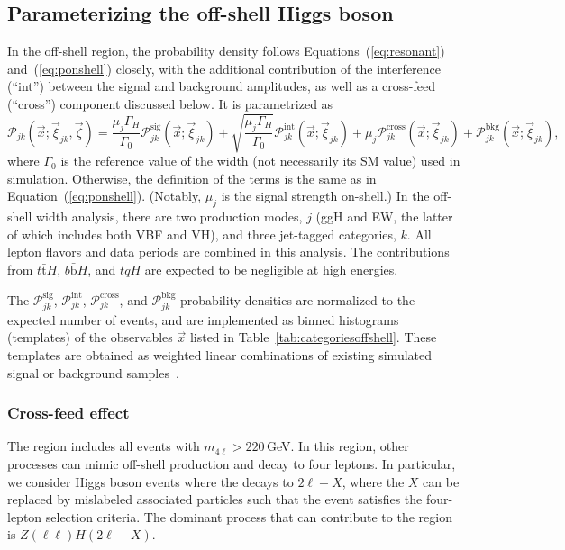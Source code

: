 \subsection{Parameterizing the off-shell Higgs boson} \label{physicsmodel}

In the off-shell region, the probability density follows Equations~(\ref{eq:resonant}) and~(\ref{eq:ponshell}) closely,
with the additional contribution of the interference (``int'') between the signal and background amplitudes,
as well as a cross-feed (``cross'') component discussed below. It is parametrized as 
\begin{equation}\label{eq:poffshell}
    \mathcal{P}_{jk}(\vec{x};\vec{\xi}_{jk},\vec\zeta) =
    \frac{\mu_j \Gamma_H}{\Gamma_0}\mathcal{P}_{jk}^\text{sig} ( \vec{x};\vec{\xi}_{jk})
    + \sqrt{\frac{\mu_j \Gamma_H}{\Gamma_0}}\mathcal{P}_{jk}^\mathrm{int} ( \vec{x};\vec{\xi}_{jk})
    + \mu_j\mathcal{P}_{jk}^\text{cross} (\vec{x};\vec{\xi}_{jk})
    + \mathcal{P}_{jk}^\text{bkg} ( \vec{x};\vec{\xi}_{jk}),
\end{equation}
where $\Gamma_0$ is the reference value of the \Hboson width (not necessarily its SM value)
used in simulation. Otherwise, the definition of the terms is the same as in Equation~(\ref{eq:ponshell}). (Notably, $\mu_j$ is the signal strength on-shell.) 
In the off-shell width analysis, there are two production modes, $j$ (ggH and EW, the latter of which includes both VBF and VH), 
and three jet-tagged categories, $k$. All lepton flavors and data periods are combined in this analysis.
The contributions from $t\bar{\text{t}}H$, $b\bar{\text{b}}H$, and $tqH$ are expected to be negligible at high energies.

The $\mathcal{P}_{jk}^{\text{sig}}$, $\mathcal{P}_{jk}^{\text{int}}$, $\mathcal{P}_{jk}^{\text{cross}}$, and $\mathcal{P}_{jk}^\text{bkg}$ probability densities are normalized to the expected number of events, and are implemented as binned histograms (templates) of the observables $\vec{x}$ listed in Table~\ref{tab:categoriesoffshell}. These templates are obtained as weighted linear combinations of existing simulated signal or background samples~\cite{PhysRevD.111.092014}.

\subsubsection{Cross-feed effect}

The \offshell region includes all events with $m_{4\ell} > 220$\,GeV. In this region, other processes can mimic off-shell \Hboson production and decay to four leptons. In particular, we consider \onshell Higgs boson events where the \Hboson decays to $2\ell + X$, where the $X$ can be replaced by mislabeled associated particles such that the event satisfies the four-lepton selection criteria. The dominant \onshell \Hboson process that can contribute to the \offshell region is $Z(\ell\ell)H(2\ell + X)$.

